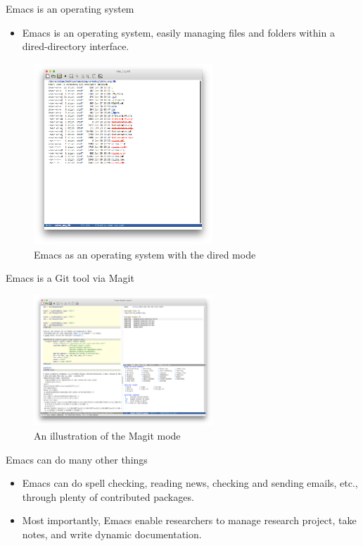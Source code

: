 \documentclass[presentation]{beamer}
\begin{document}
\begin{frame}[label={sec:org4913b18}]{Emacs is an operating system}
\begin{itemize}
\item Emacs is an operating system, easily managing files and folders
within a dired-directory interface.
\end{itemize}

\begin{figure}[htbp]
\centering
\includegraphics[width=0.6\textwidth,height=0.6\textheight]{figure/dired_example.png}
\caption{Emacs as an operating system with the dired mode}
\end{figure}
\end{frame}

\begin{frame}[label={sec:org37f5540}]{Emacs is a Git tool via Magit}
\begin{figure}[htbp]
\centering
\includegraphics[width=0.6\textwidth]{figure/magit_example.png}
\caption{An illustration of the Magit mode}
\end{figure}
\end{frame}

\begin{frame}[label={sec:org73a7e4e}]{Emacs can do many other things}
\begin{itemize}
\item Emacs can do spell checking, reading news, checking and sending
emails, etc., through plenty of contributed packages.
\item Most importantly, Emacs enable researchers to manage research
project, take notes, and write dynamic documentation.
\end{itemize}
\end{frame}
\end{document}
